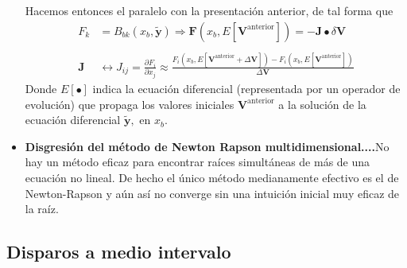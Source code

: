 \documentclass[spanish,titlepage,11pt]{article}
\begin{document}
\begin{itemize}
Hacemos entonces el paralelo con la presentaci\'{o}n anterior, de tal forma
que
\begin{align*}
F_{k}  &  =B_{bk}\left(  x_{b},\mathbf{\tilde{y}}\right)  \Rightarrow
\mathbf{F}\left(  x_{b},E\left[  \mathbf{V}^{\mathrm{anterior}}\right]
\right)  =-\mathbf{J\bullet}\delta\mathbf{V}\\
& \\
\mathbf{J}  &  \longleftrightarrow J_{ij}=\frac{\partial F_{i}}{\partial
x_{j}}\approx\frac{F_{i}\left(  x_{b},E\left[  \mathbf{V}^{\mathrm{anterior}%
}+\Delta\mathbf{V}\right]  \right)  -F_{i}\left(  x_{b},E\left[
\mathbf{V}^{\mathrm{anterior}}\right]  \right)  }{\Delta\mathbf{V}}%
\end{align*}
Donde $E\left[  \mathbf{\bullet}\right]  $ indica la ecuaci\'{o}n diferencial
(representada por un operador de evoluci\'{o}n) que propaga los valores
iniciales $\mathbf{V}^{\mathrm{anterior}}$ a la soluci\'{o}n de la
ecuaci\'{o}n diferencial $\mathbf{\tilde{y},}$ en $x_{b}.$

\item \textbf{Disgresi\'{o}n del m\'{e}todo de Newton Rapson
multidimensional....}\newline No hay un m\'{e}todo eficaz para encontrar
ra\'{i}ces simult\'{a}neas de m\'{a}s de una ecuaci\'{o}n no lineal. De hecho
el \'{u}nico m\'{e}todo medianamente efectivo es el de Newton-Rapson y a\'{u}n
as\'{i} no converge sin una intuici\'{o}n inicial muy eficaz de la ra\'{i}z.
\end{itemize}

\subsection{Disparos a medio intervalo}
\end{document}
